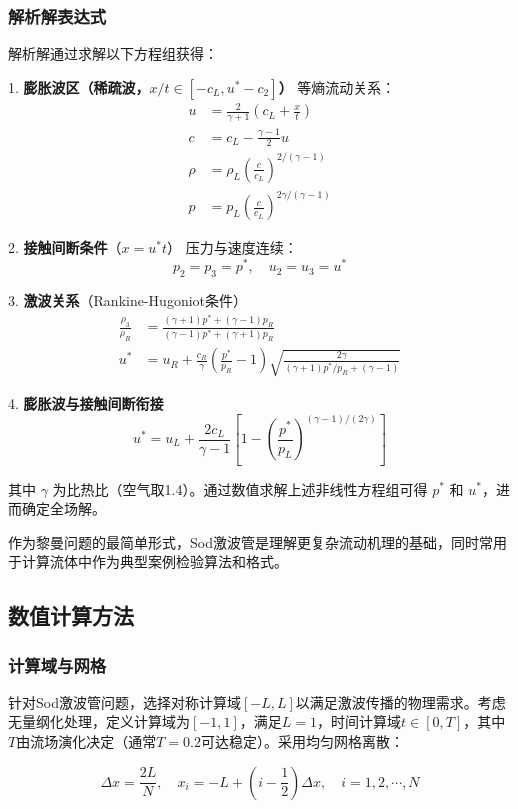 \documentclass[UTF8]{ctexart}
\begin{document}
\subsubsection{解析解表达式}
解析解通过求解以下方程组获得：

1. \textbf{膨胀波区（稀疏波，$x/t \in [-c_L, u^*-c_2]$）}  
   等熵流动关系：
   \begin{align*}
   u &= \frac{2}{\gamma+1}\left(c_L + \frac{x}{t}\right) \\
   c &= c_L - \frac{\gamma-1}{2}u \\
   \rho &= \rho_L \left(\frac{c}{c_L}\right)^{2/(\gamma-1)} \\
   p &= p_L \left(\frac{c}{c_L}\right)^{2\gamma/(\gamma-1)}
   \end{align*}

2. \textbf{接触间断条件}（$x = u^* t$）  
   压力与速度连续：
   $$p_2 = p_3 = p^*, \quad u_2 = u_3 = u^*$$

3. \textbf{激波关系}（Rankine-Hugoniot条件）  
   \begin{align*}
   \frac{\rho_3}{\rho_R} &= \frac{(\gamma+1)p^* + (\gamma-1)p_R}{(\gamma-1)p^* + (\gamma+1)p_R} \\
   u^* &= u_R + \frac{c_R}{\gamma}\left(\frac{p^*}{p_R}-1\right)\sqrt{\frac{2\gamma}{(\gamma+1)p^*/p_R + (\gamma-1)}}
   \end{align*}

4. \textbf{膨胀波与接触间断衔接}  
   $$u^* = u_L + \frac{2c_L}{\gamma-1}\left[1 - \left(\frac{p^*}{p_L}\right)^{(\gamma-1)/(2\gamma)}\right]$$

其中 $\gamma$ 为比热比（空气取1.4）。通过数值求解上述非线性方程组可得 $p^*$ 和 $u^*$，进而确定全场解。

作为黎曼问题的最简单形式，Sod激波管是理解更复杂流动机理的基础，同时常用于计算流体中作为典型案例检验算法和格式。

\subsection{数值计算方法}
\subsubsection{计算域与网格}
针对Sod激波管问题，选择对称计算域$[-L,L]$以满足激波传播的物理需求。考虑无量纲化处理，定义计算域为$[-1,1]$，满足$L=1$，时间计算域$t\in[0,T]$，其中$T$由流场演化决定（通常$T=0.2$可达稳定）。采用均匀网格离散：

$$\Delta x = \frac{2L}{N},\quad x_i = -L + \left(i-\frac{1}{2}\right)\Delta x,\quad i=1,2,\cdots,N$$
\end{document}
